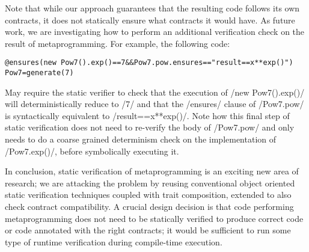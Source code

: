 Note that while our approach guarantees that the resulting code follows its own contracts, it does not statically ensure what contracts it would have.
As future work, we are investigating how
to perform an additional verification check
on the result of metaprogramming.
For example, the following code:
\vspace{-1ex}
\begin{lstlisting}[numbers=none]
@ensures(new Pow7().exp()==7&&Pow7.pow.ensures=="result==x**exp()")
Pow7=generate(7)
\end{lstlisting}
\vspace{-1ex}
May require the static verifier to check that the execution of
/new Pow7().exp()/ will deterministically reduce to /7/ and that the /ensures/ clause of 
/Pow7.pow/ is syntactically equivalent to 
/result==x**exp()/. Note how this final step of static verification does not need to re-verify the body of
/Pow7.pow/ and only needs to do a coarse grained 
determinism check on the implementation of /Pow7.exp()/, before symbolically executing it.

In conclusion, static verification of metaprogramming is an exciting new area of research; we are attacking the problem by reusing conventional
object oriented static verification techniques coupled with trait composition, extended to also check contract compatibility. A crucial design decision is that code performing metaprogramming does not need to be statically verified to produce correct code or code annotated with the right contracts; it would be sufficient to run some type of runtime verification during compile-time execution.